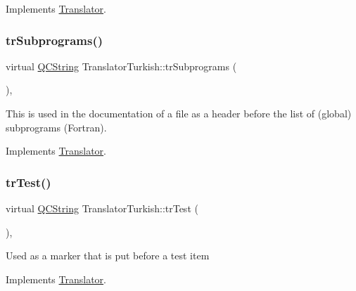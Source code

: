 Implements \mbox{\hyperlink{class_translator}{Translator}}.

\mbox{\label{class_translator_turkish_aa593c56e62853caa36fa4e3e883277fd}} 
\subsubsection{\texorpdfstring{trSubprograms()}{trSubprograms()}}
{\footnotesize\ttfamily virtual \mbox{\hyperlink{class_q_c_string}{Q\+C\+String}} Translator\+Turkish\+::tr\+Subprograms (\begin{DoxyParamCaption}{ }\end{DoxyParamCaption})\hspace{0.3cm}{\ttfamily [inline]}, {\ttfamily [virtual]}}

This is used in the documentation of a file as a header before the list of (global) subprograms (Fortran). 

Implements \mbox{\hyperlink{class_translator}{Translator}}.

\mbox{\label{class_translator_turkish_ad036633830deca6275e4fed3b240f55f}} 
\subsubsection{\texorpdfstring{trTest()}{trTest()}}
{\footnotesize\ttfamily virtual \mbox{\hyperlink{class_q_c_string}{Q\+C\+String}} Translator\+Turkish\+::tr\+Test (\begin{DoxyParamCaption}{ }\end{DoxyParamCaption})\hspace{0.3cm}{\ttfamily [inline]}, {\ttfamily [virtual]}}

Used as a marker that is put before a test item 

Implements \mbox{\hyperlink{class_translator}{Translator}}.

\mbox{\label{class_translator_turkish_abf8a1548f4dd8ed30cba6de12906a86e}} 
